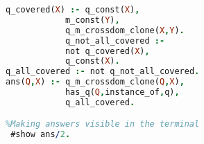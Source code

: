 \begin{lstlisting}[language=Prolog]
%Extracting the answers to the input question. (Step 5)
q_covered(X) :- q_const(X),
			m_const(Y),
			q_m_crossdom_clone(X,Y).
			q_not_all_covered :-
			not q_covered(X),
			q_const(X).
q_all_covered :- not q_not_all_covered.
ans(Q,X) :- q_m_crossdom_clone(Q,X),
			has_q(Q,instance_of,q),
			q_all_covered.

%Making answers visible in the terminal
 #show ans/2.



\end{lstlisting}